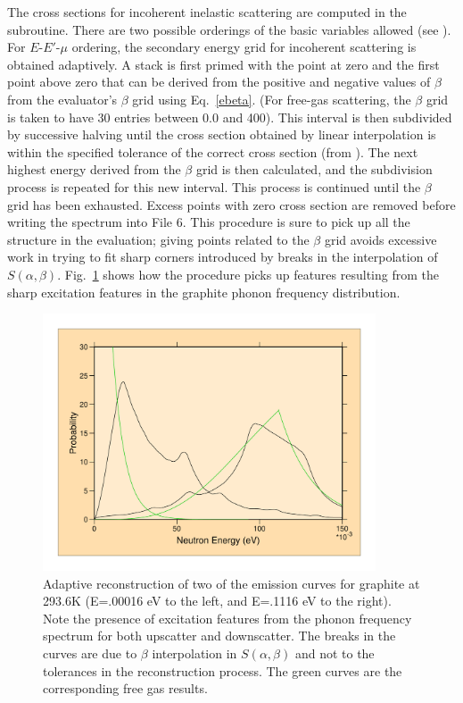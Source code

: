 The cross sections for incoherent inelastic scattering are computed
in the  subroutine.  There
are two possible orderings of the basic variables allowed (see
).  For $E$-$E'$-$\mu$ ordering, the secondary energy grid
for incoherent scattering is obtained adaptively.  A stack is first primed
with the point at zero and the first point above zero that can be derived
from the positive and negative values of $\beta$ from the evaluator's
$\beta$ grid using Eq.~\ref{ebeta}.  (For free-gas scattering, the
$\beta$ grid is taken to have 30 entries between 0.0 and 400).
This interval is then subdivided by successive halving until the
cross section obtained by linear interpolation is within the specified
tolerance of the correct cross section (from
). The next
highest energy derived from the $\beta$ grid is then calculated,
and the subdivision process is repeated for this new interval.
This process is continued until the $\beta$ grid has been exhausted.
Excess points with zero cross section are removed before writing
the spectrum into File 6.  This procedure is sure to pick up all the
structure in the evaluation; giving points related to the $\beta$
grid avoids excessive work in trying to fit sharp corners introduced by
breaks in the interpolation of $S(\alpha,\beta)$.  Fig.~\ref{graph}
shows how the procedure picks up features resulting from the sharp
excitation features in the graphite phonon frequency distribution.

\begin{figure}[thb]\centering
\includegraphics[keepaspectratio, height=3.0in, angle=0]{figs/thermr2ack}
  \caption[Adaptive reconstruction of emission spectra (graphite)]{Adaptive
 reconstruction of two of the emission curves for graphite at 293.6K
 (E=.00016 eV to the left, and E=.1116 eV to the right).  Note the
 presence of excitation features from the phonon frequency spectrum
 for both upscatter and downscatter.  The breaks in the curves are due
 to $\beta$ interpolation in $S(\alpha,\beta)$ and not to the tolerances
 in the reconstruction process.  The green curves are the corresponding
 free gas results.}
\label{graph}
\end{figure}

